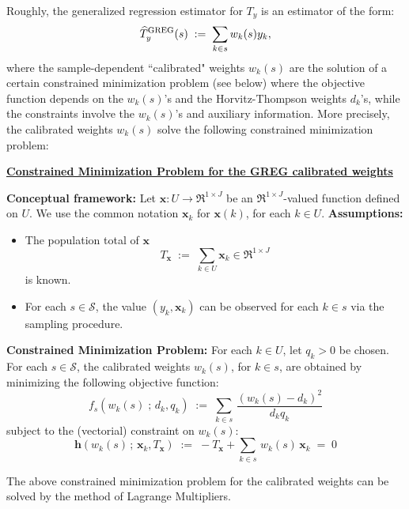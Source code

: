 \documentclass{article}
\begin{document}
Roughly, the generalized regression estimator for $T_{y}$ is an estimator of the form:
\begin{equation*}
\widehat{T}^{\textnormal{GREG}}_{y}(s)
\; := \;
\sum_{k \in s} w_{k}(s) y_{k},
\end{equation*}
where the sample-dependent ``calibrated" weights $w_{k}(s)$ are the solution of a
certain constrained minimization problem (see below) where the objective function
depends on the $w_{k}(s)$'s and the Horvitz-Thompson weights $d_{k}$'s, while
the constraints involve the $w_{k}(s)$'s and auxiliary information.
More precisely, the calibrated weights $w_{k}(s)$ solve the following constrained
minimization problem:
\vskip 1.0cm
\begin{center}
\begin{minipage}{6.0in}
\begin{center}
\textbf{\large\underline{Constrained Minimization Problem for the GREG calibrated weights}}
\end{center}
\noindent
\textbf{Conceptual framework:}\;\;
Let $\mathbf{x} : U \longrightarrow \Re^{1 \times J}$ be an $\Re^{1 \times J}$-valued
function defined on $U$.
We use the common notation $\mathbf{x}_{k}$ for $\mathbf{x}(k)$, for each $k \in U$.
\vskip 0.3cm
\noindent
\textbf{Assumptions:}
\begin{itemize}
\item	The population total of $\mathbf{x}$
		\begin{equation*} T_{\mathbf{x}} \; := \; \sum_{k \in U} \mathbf{x}_{k} \in \Re^{1\times J} \end{equation*}
		is known.
\item	For each $s \in \mathcal{S}$, the value $(y_{k},\mathbf{x}_{k})$ can be observed for each $k \in s$ via the sampling procedure.
\end{itemize}
\vskip 0.3cm
\noindent
\textbf{Constrained Minimization Problem:}\;\;
For each $k \in U$, let $q_{k} > 0$ be chosen.
For each $s \in \mathcal{S}$, the calibrated weights $w_{k}(s)$, for $k \in s$, are obtained
by minimizing the following objective function:
\begin{equation*}
f_{s}(w_{k}(s)\;;\,d_{k},q_{k})
\;:=\;\sum_{k \in s}\,\dfrac{(w_{k}(s) - d_{k})^{2}}{d_{k}q_{k}}
\end{equation*}
subject to the (vectorial) constraint on $w_{k}(s)$:
\begin{equation*}
\mathbf{h}(w_{k}(s)\,;\,\mathbf{x}_{k},T_{\mathbf{x}})
\;:=\; - T_{\mathbf{x}} + \sum_{k \in s}\, w_{k}(s)\,\mathbf{x}_{k} \; = \; 0
\end{equation*}
\end{minipage}
\end{center}
\vskip 1.0cm
The above constrained minimization problem for the calibrated weights can be solved
by the method of Lagrange Multipliers.
\end{document}
